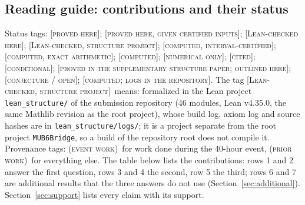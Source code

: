 \documentclass[11pt]{article}
\newcommand{\st}[1]{\textsc{[#1]}}
\newcommand{\stproved}{\st{proved here}}
\newcommand{\stlean}{\st{Lean-checked, structure project}}
\newcommand{\stsupp}{\st{proved in the supplementary structure paper; outlined here}}
\newcommand{\stleanA}{\st{Lean-checked here}}
\newcommand{\stexact}{\st{computed, exact arithmetic}}
\newcommand{\stgiven}{\st{proved here, given certified inputs}}
\newcommand{\stcert}{\st{computed, interval-certified}}
\newcommand{\stcomp}{\st{computed}}
\newcommand{\stnum}{\st{numerical only}}
\newcommand{\stcited}{\st{cited}}
\newcommand{\stcond}{\st{conditional}}
\newcommand{\stconj}{\st{conjecture / open}}
\newcommand{\streported}{\st{computed; logs in the repository}}
\newcommand{\event}{\textsc{(event work)}}
\newcommand{\prior}{\textsc{(prior work)}}
\theoremstyle{definition}
\theoremstyle{remark}
\begin{document}
\subsection*{Reading guide: contributions and their status}

Status tags: \stproved; \stgiven; \stleanA; \stlean; \stcert; \stexact; \stcomp; \stnum; \stcited; \stcond;
\stsupp; \stconj; \streported. The tag \stlean\ means: formalized in the Lean project \texttt{lean\_structure/} of the submission repository (46 modules, Lean v4.35.0, the same Mathlib revision as the root project), whose build log, axiom log and source hashes are in \texttt{lean\_structure/logs/}; it is a project separate from the root project \texttt{MUB6Bridge}, so a build of the repository root does not compile it. Provenance tags: \event\ for work done during the 40-hour event, \prior\ for everything else.
The table below lists the contributions: rows 1 and 2 answer the first question, rows 3
and 4 the second, row 5 the third; rows 6 and 7 are additional results that the three answers do not use
(Section~\ref{sec:additional}). Section~\ref{sec:support} lists every claim with its support.
\end{document}
